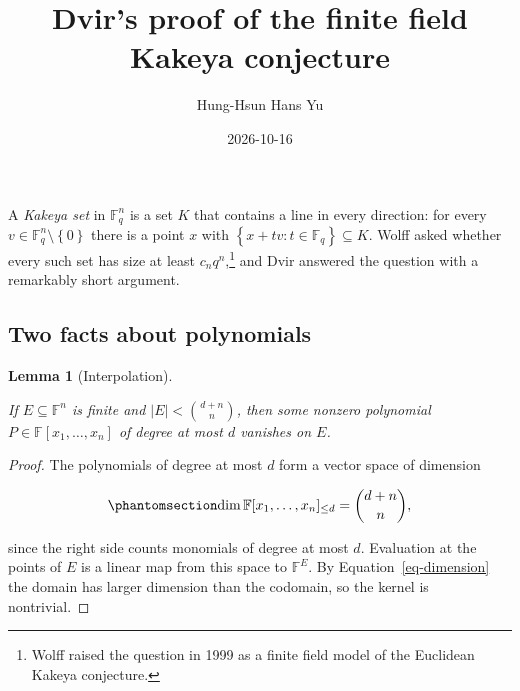 \documentclass[
  11pt,
]{article}
\title{Dvir's proof of the finite field Kakeya conjecture}
\author{Hung-Hsun Hans Yu}
\date{2026-10-16}
\renewcommand*\contentsname{Table of contents}
\newcommand\contentsname{Table of contents}
\theoremstyle{plain}
\theoremstyle{plain}
\newtheorem{lemma}{Lemma}[section]
\theoremstyle{remark}
\begin{document}
\maketitle

\renewcommand*\contentsname{Table of contents}
{
\setcounter{tocdepth}{3}
\tableofcontents
}

\providecommand{\F}{\mathbb{F}}
\providecommand{\R}{\mathbb{R}}
\providecommand{\C}{\mathbb{C}}
\providecommand{\Z}{\mathbb{Z}}
\providecommand{\N}{\mathbb{N}}
\providecommand{\Q}{\mathbb{Q}}
\providecommand{\E}{\mathbb{E}}
\providecommand{\P}{\mathbb{P}}
\providecommand{\eps}{\varepsilon}
\providecommand{\abs}[1]{\left|#1\right|}
\providecommand{\norm}[1]{\left\lVert#1\right\rVert}
\providecommand{\set}[1]{\left\{#1\right\}}
\providecommand{\floor}[1]{\left\lfloor#1\right\rfloor}
\providecommand{\ceil}[1]{\left\lceil#1\right\rceil}
\providecommand{\poly}{\operatorname{poly}}

A \emph{Kakeya set} in \(\mathbb{F}_q^n\) is a set \(K\) that contains a
line in every direction: for every
\(v \in \mathbb{F}_q^n \setminus \left\{0\right\}\) there is a point
\(x\) with \(\left\{x + tv : t \in \mathbb{F}_q\right\} \subseteq K\).
Wolff asked whether every such set has size at least
\(c_n q^n\),\footnote{Wolff raised the question in 1999 as a finite
  field model of the Euclidean Kakeya conjecture.} and Dvir answered the
question with a remarkably short argument.

\subsection{Two facts about
polynomials}\label{two-facts-about-polynomials}

\begin{lemma}[Interpolation]\protect\hypertarget{lem-interpolation}{}\label{lem-interpolation}

If \(E \subseteq \mathbb{F}^n\) is finite and
\(\left|E\right| < \binom{d+n}{n}\), then some nonzero polynomial
\(P \in \mathbb{F}[x_1, \dots, x_n]\) of degree at most \(d\) vanishes
on \(E\).

\end{lemma}

\begin{proof}
The polynomials of degree at most \(d\) form a vector space of dimension

\begin{equation}\protect\phantomsection\label{eq-dimension}{
\dim \mathbb{F}[x_1, \dots, x_n]_{\le d} = \binom{d+n}{n},
}\end{equation}

since the right side counts monomials of degree at most \(d\).
Evaluation at the points of \(E\) is a linear map from this space to
\(\mathbb{F}^E\). By Equation~\ref{eq-dimension} the domain has larger
dimension than the codomain, so the kernel is nontrivial.
\end{proof}
\end{document}
